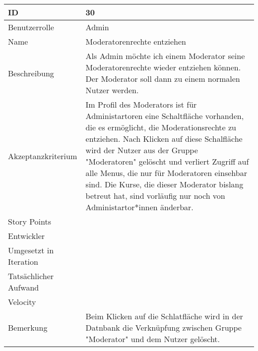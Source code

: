 \begin{tabularx}{\textwidth}{|p{}|X|}
	\hline
	ID & 30 \\
	\hline
	Benutzerrolle & Admin \\
	\hline
	Name & Moderatorenrechte entziehen\\
	\hline
	Beschreibung & Als Admin möchte ich einem Moderator seine Moderatorenrechte wieder entziehen können. Der Moderator soll dann zu einem normalen Nutzer werden. \\
	\hline
	Akzeptanzkriterium & Im Profil des Moderators ist für Administartoren eine Schaltfläche vorhanden, die es ermöglicht, die Moderationsrechte zu entziehen. Nach Klicken auf diese Schalfläche wird der Nutzer aus der Gruppe "Moderatoren" gelöscht und verliert Zugriff auf alle Menus, die nur für Moderatoren einsehbar sind. Die Kurse, die dieser Moderator bislang betreut hat, sind vorläufig nur noch von Administartor*innen änderbar. \\
	\hline
	Story Points &  \\
	\hline
	Entwickler &  \\
	\hline
	Umgesetzt in Iteration & \\
	\hline
	Tatsächlicher Aufwand & \\
	\hline
	Velocity & \\
	\hline
	Bemerkung & Beim Klicken auf die Schlatfläche wird in der Datnbank die Verknüpfung zwischen Gruppe "Moderator" und dem Nutzer gelöscht.\\
	\hline
\end{tabularx}
\vspace{20pt}

